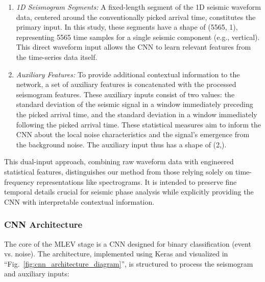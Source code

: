 \documentclass[conference]{IEEEtran}
\begin{document}
        \begin{enumerate}
            \item \textit{1D Seismogram Segments:} A fixed-length segment of the 1D seismic waveform data, centered
            around the conventionally picked arrival time, constitutes the primary input. In this study, these segments
            have a shape of (5565, 1), representing 5565 time samples for a single seismic component (e.g., vertical).
            This direct waveform input allows the CNN to learn relevant features from the time-series data itself.
            \item \textit{Auxiliary Features:} To provide additional contextual information to the network, a set of
            auxiliary features is concatenated with the processed seismogram features. These auxiliary inputs consist of
            two values: the standard deviation of the seismic signal in a window immediately preceding the picked
            arrival time, and the standard deviation in a window immediately following the picked arrival time. These
            statistical measures aim to inform the CNN about the local noise characteristics and the signal's emergence
            from the background noise. The auxiliary input thus has a shape of (2,).
        \end{enumerate}
        This dual-input approach, combining raw waveform data with engineered statistical features, distinguishes our
        method from those relying solely on time-frequency representations like spectrograms. It is intended to preserve
        fine temporal details crucial for seismic phase analysis while explicitly providing the CNN with interpretable
        contextual information.

        \subsubsection{CNN Architecture}
            The core of the MLEV stage is a CNN designed for binary classification (event vs. noise). The
            architecture, implemented using Keras \cite{Chollet2021} and visualized in ``Fig.~\ref{fig:cnn_architecture_diagram}'', is structured to process the seismogram and
            auxiliary inputs:
        
\end{document}
